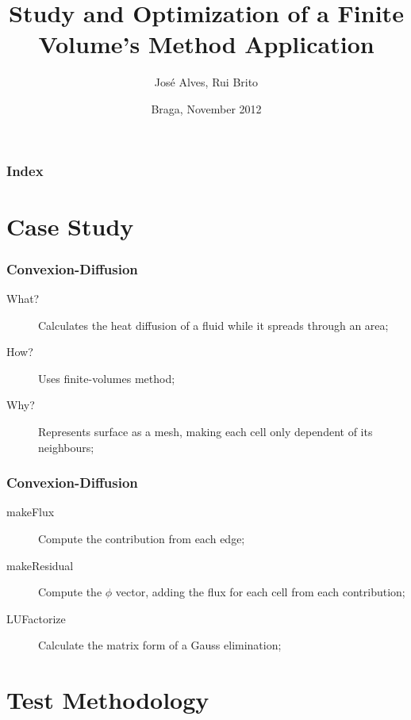 \documentclass{beamer}
\title{Study and Optimization of a Finite Volume's Method Application}
\author{José Alves, Rui Brito}
\institute[pg22765, pg22781]{
	Universidade do Minho
}
\date{Braga, November 2012}
\begin{document}

\maketitle%

\begin{frame}
	\frametitle{Index}
	\tableofcontents
\end{frame}

\section{Case Study}

\begin{frame}[plain]
	\frametitle{Convexion-Diffusion}
	\begin{description}
		\item [What?] Calculates the heat diffusion of a fluid while it spreads through an area;
		\item [How?] Uses finite-volumes method;
		\item [Why?] Represents surface as a mesh, making each cell only dependent of its neighbours;
	\end{description}
\end{frame}

\begin{frame}[plain]
	\frametitle{Convexion-Diffusion}
	\begin{description}
		\item [makeFlux] Compute the contribution from each edge;
		\item [makeResidual] Compute the $\phi$ vector, adding the flux for each cell from each contribution;
		\item [LUFactorize] Calculate the matrix form of a Gauss elimination;
	\end{description}
\end{frame}


\section{Test Methodology}
\end{document}
